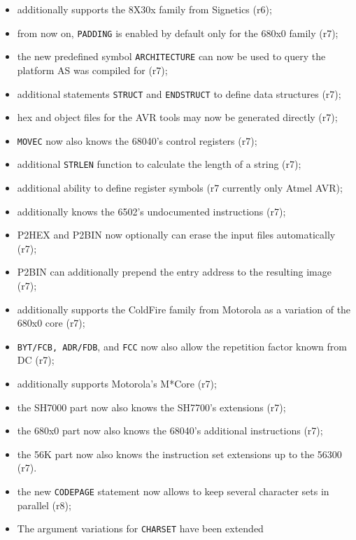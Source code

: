 \documentclass[12pt,twoside]{report}
\newcommand{\tty}[1]{{\tt #1}}
\begin{document}
\begin{itemize}
{\begin{itemize}
{            be set explicitly via prefixes (r6);}
      \item{additionally supports the 8X30x family from Signetics
            (r6);}
      \item{from now on, \tty{PADDING} is enabled by default only
            for the 680x0 family (r7);}
      \item{the new predefined symbol \tty{ARCHITECTURE} can now be
            used to query the platform AS was compiled for (r7);}
      \item{additional statements \tty{STRUCT} and \tty{ENDSTRUCT}
            to define data structures (r7);}
      \item{hex and object files for the AVR tools may now be generated
            directly (r7);}
      \item{\tty{MOVEC} now also knows the 68040's control registers
            (r7);}
      \item{additional \tty{STRLEN} function to calculate the length
            of a string (r7);}
      \item{additional ability to define register symbols (r7 currently
            only Atmel AVR);}
      \item{additionally knows the 6502's undocumented instructions (r7);}
      \item{P2HEX and P2BIN now optionally can erase the input files
            automatically (r7);}
      \item{P2BIN can additionally prepend the entry address to the
            resulting image (r7);}
      \item{additionally supports the ColdFire family from Motorola as a
            variation of the 680x0 core (r7);}
      \item{\tty{BYT/FCB, ADR/FDB}, and \tty{FCC} now also allow the
            repetition factor known from DC (r7);}
      \item{additionally supports Motorola's M*Core (r7);}
      \item{the SH7000 part now also knows the SH7700's
            extensions (r7);}
      \item{the 680x0 part now also knows the 68040's additional
            instructions (r7);}
      \item{the 56K part now also knows the instruction set extensions
            up to the 56300 (r7).}
      \item{the new \tty{CODEPAGE} statement now allows to keep several
            character sets in parallel (r8);}
      \item{The argument variations for \tty{CHARSET} have been extended
}
\end{itemize}}
\end{itemize}
\end{document}
